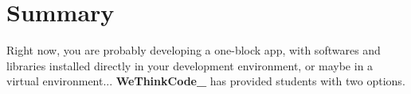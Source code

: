 
\makeindex



\renewcommand{\sectionmark}[1]{\markright{\spacedlowsmallcaps{#1}}} %
\lehead{\mbox{\llap{\small\thepage\kern1em\color{halfgray} \vline}\color{halfgray}\hspace{0.5em}\rightmark\hfil}} %

\pagestyle{scrheadings} %



\newpage

\setcounter{tocdepth}{2} %

\tableofcontents %

\newpage





\newpage

\section{Summary}

Right now, you are probably developing a one-block app, with softwares and libraries
installed directly in your development environment, or maybe in a virtual environment...
\textbf{WeThinkCode\_} has provided students with two options.\\

